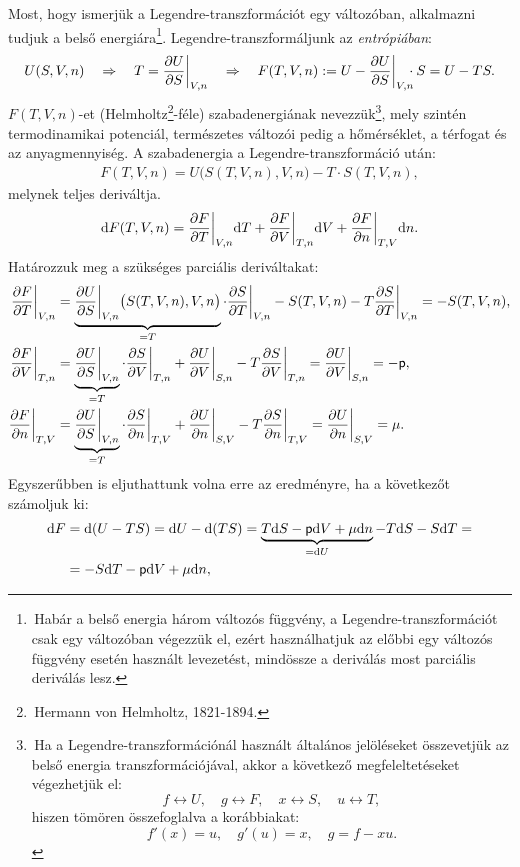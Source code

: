 Most, hogy ismerjük a Legendre-transzformációt egy változóban, alkalmazni tudjuk a belső energiára\footnote{\,Habár a belső energia három változós függvény, a Legendre-transzformációt csak egy változóban végezzük el, ezért használhatjuk az előbbi egy változós függvény esetén használt levezetést, mindössze a deriválás most parciális deriválás lesz.}. Legendre-transzformáljunk az \emph{entrópiában}:
\begin{align}
	U(S,V,n)\follows T = \pd US\bigg|_{V,n} \follows F(T,V,n):= U - \pd US\bigg|_{V,n}\hspace{-2mm}\cdot S = U-TS.
\end{align}
$F(T,V,n)$-et (Helmholtz\footnote{\,Hermann von Helmholtz, 1821-1894.}-féle) szabadenergiának nevezzük\footnote{\,Ha a Legendre-transzformációnál használt általános jelöléseket összevetjük az belső energia transzformációjával, akkor a következő megfeleltetéseket végezhetjük el:
$$ f\leftrightarrow U,\quad g \leftrightarrow F, \quad x \leftrightarrow S,\quad u \leftrightarrow T,$$
hiszen tömören összefoglalva a korábbiakat:
$$f'(x)=u,\quad g'(u) = x,\quad g=f-xu.$$}, mely szintén termodinamikai potenciál, természetes változói pedig a hőmérséklet, a térfogat és az anyagmennyiség.
A szabadenergia a Legendre-transzformáció után:
\begin{align}
	F(T,V,n) = U\big(S(T,V,n),V,n\big) - T\cdot S(T,V,n),
\end{align}
melynek teljes deriváltja.
\begin{align}
\mathrm{d}F(T,V,n) = \frac{\partial{F}}{\partial{T}}\bigg|_{V,n}\mathrm{d}T + \frac{\partial{F}}{\partial{V}} \bigg|_{T,n} \mathrm{d}V + \frac{\partial{F}}{\partial{n}}\bigg|_{T,V}\mathrm{d}n.
\end{align}
Határozzuk meg a szükséges parciális deriváltakat:
\begin{align}
	\frac{\partial{F}}{\partial{T}}\bigg|_{V,n} &= \underbrace{\frac{\partial{U}}{\partial{S}}\bigg|_{V,n}\big(S(T,V,n),V,n\big)}_{=T}\cdot \frac{\partial{S}}{\partial{T}}\bigg|_{V,n}-S(T,V,n)- T\frac{\partial{S}}{\partial{T}}\bigg|_{V,n} = -S(T,V,n),\\
	\frac{\partial{F}}{\partial{V}}\bigg|_{T,n} &= \underbrace{\frac{\partial{U}}{\partial{S}}\bigg|_{V,n}}_{=T}\cdot \frac{\partial{S}}{\partial{V}}\bigg|_{T,n}+\frac{\partial{U}}{\partial{V}}\bigg|_{S,n}-T\frac{\partial{S}}{\partial{V}}\bigg|_{T,n} = \frac{\partial{U}}{\partial{V}}\bigg|_{S,n} = -\mathsf p,\\
	\frac{\partial{F}}{\partial{n}}\bigg|_{T,V} &= \underbrace{\frac{\partial{U}}{\partial{S}}\bigg|_{V,n}}_{=T}\cdot \frac{\partial{S}}{\partial{n}}\bigg|_{T,V}+\frac{\partial{U}}{\partial{n}}\bigg|_{S,V}- T\frac{\partial{S}}{\partial{n}}\bigg|_{T,V} = \frac{\partial{U}}{\partial{n}}\bigg|_{S,V} = \mu.
\end{align}
Egyszerűbben is eljuthattunk volna erre az eredményre, ha a következőt számoljuk ki:
\begin{align}
\begin{split}
	\mathrm{d}F &= \mathrm{d}(U-TS) = \mathrm{d}U -\mathrm{d}(TS) = \underbrace{T\mathrm{d}S-\mathsf p\mathrm{d}V+\mu\mathrm{d}n}_{= \mathrm{d}U} - T\mathrm{d}S-S\mathrm{d}T = \\
	&= -S\mathrm{d}T-\mathsf p\mathrm{d}V+\mu \mathrm{d}n,
\end{split}
\end{align}
